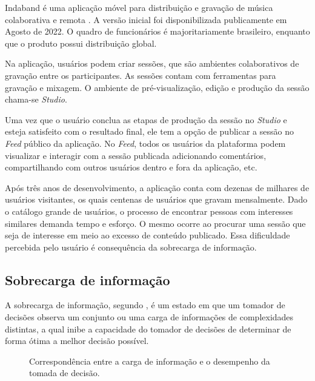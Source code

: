 Indaband é uma aplicação móvel para distribuição e gravação de música
colaborativa e remota \cite{indaband}. A versão inicial foi disponibilizada
publicamente em Agosto de 2022. O quadro de funcionários é majoritariamente
brasileiro, enquanto que o produto possui distribuição global.



Na aplicação, usuários podem criar sessões, que são ambientes colaborativos de
gravação entre os participantes. As sessões contam com ferramentas para gravação
e mixagem. O ambiente de pré-visualização, edição e produção da sessão chama-se
\textit{Studio}.

Uma vez que o usuário conclua as etapas de produção da sessão no \textit{Studio}
e esteja satisfeito com o resultado final, ele tem a opção de publicar a sessão
no \textit{Feed} público da aplicação. No \textit{Feed}, todos os usuários da
plataforma podem visualizar e interagir com a sessão publicada
adicionando comentários, compartilhando com outros usuários dentro e fora da
aplicação, etc.

Após três anos de desenvolvimento, a aplicação conta com dezenas de milhares de
usuários visitantes, os quais centenas de usuários que gravam mensalmente. Dado
o catálogo grande de usuários, o processo de encontrar pessoas com interesses
similares demanda tempo e esforço. O mesmo ocorre ao procurar uma sessão que
seja de interesse em meio ao excesso de conteúdo publicado. Essa dificuldade
percebida pelo usuário é consequência da sobrecarga de informação.

\subsection{Sobrecarga de informação}

A sobrecarga de informação, segundo \citet{roetzel2019information}, é um estado em que um tomador de decisões observa um
conjunto ou uma carga de informações de complexidades distintas, a qual inibe a
capacidade do tomador de decisões de determinar de forma ótima a melhor decisão
possível.

\vspace{0.2cm}
\begin{figure}[h]
    \caption{Correspondência entre a carga de informação e o desempenho da tomada
    de decisão.}
    \label{fig:u_invertida}
\end{figure}
\vspace{0.2cm}

